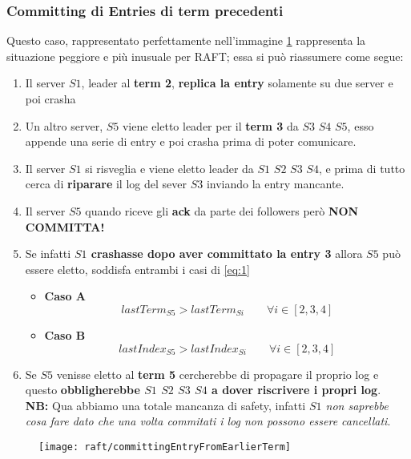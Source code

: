   \subsubsection{Committing di Entries di term precedenti}
  Questo caso, rappresentato perfettamente nell'immagine \ref{fig:figure12} rappresenta la situazione peggiore e più inusuale per RAFT; essa si può riassumere come segue:
  \begin{enumerate}
    \item{Il server $S1$, leader al \textbf{term 2}, \textbf{replica la entry} solamente su due server e poi crasha}
    \item{Un altro server, $S5$ viene eletto leader per il \textbf{term 3} da $S3$ $S4$ $S5$, esso appende una serie di entry e poi crasha prima di poter comunicare.}
    \item{Il server $S1$ si risveglia e viene eletto leader da $S1$ $S2$ $S3$ $S4$, e prima di tutto cerca di \textbf{riparare} il log del sever $S3$ inviando la entry mancante.}
    \item{Il server $S5$ quando riceve gli \textbf{ack} da parte dei followers però \textbf{NON COMMITTA!}}
    \item{Se infatti \textbf{$S1$ crashasse dopo aver committato la entry 3} allora $S5$ può essere eletto, soddisfa entrambi i casi di \ref{eq:1}}
    \begin{itemize}
      \item{\textbf{Caso A}}
      \[
        lastTerm_{S5} > lastTerm_{Si} \qquad \forall i \in [2,3,4]
      \]
      \item{\textbf{Caso B}}
      \[
        lastIndex_{S5} > lastIndex_{Si} \qquad \forall i \in [2,3,4]
      \]
    \end{itemize}
    \item{Se $S5$ venisse eletto al \textbf{term 5} cercherebbe di propagare il proprio log e questo \textbf{obbligherebbe $S1$ $S2$ $S3$ $S4$ a dover riscrivere i propri log}.\\
    \textbf{NB:} Qua abbiamo una totale mancanza di safety, infatti \emph{$S1$ non saprebbe cosa fare dato che una volta commitati i log non possono essere cancellati}}.
  \end{enumerate}
  \begin{figure}[H]
    \centering
    \texttt{[image: raft/committingEntryFromEarlierTerm]}
    \caption[stateDiagramCaption]{}
    \label{fig:figure12}
  \end{figure}

